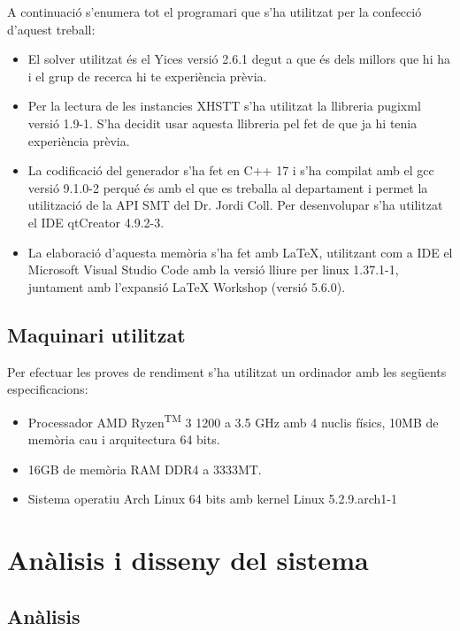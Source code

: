 \documentclass[11pt,a4paper,twoside]{report}
\begin{document}
  A continuació s'enumera tot el programari que s'ha utilitzat per la confecció d'aquest treball:
  \begin{itemize}
  \item El solver utilitzat és el Yices versió 2.6.1 degut a que és dels millors que hi ha i el grup de recerca hi te experiència prèvia. 
  \item Per la lectura de les instancies XHSTT s'ha utilitzat la llibreria pugixml versió 1.9-1. S'ha decidit usar aquesta llibreria pel fet de que ja hi tenia experiència prèvia.
  \item La codificació del generador s'ha fet en C++ 17 i s'ha compilat amb el gcc versió 9.1.0-2 perqué és amb el que es treballa al departament i permet la utilització de la API SMT del Dr. Jordi Coll. Per desenvolupar s'ha utilitzat el IDE qtCreator 4.9.2-3.
  \item La elaboració d'aquesta memòria s'ha fet amb \LaTeX, utilitzant com a IDE el Microsoft Visual Studio Code amb la versió lliure per linux 1.37.1-1, juntament amb l'expansió LaTeX Workshop (versió 5.6.0). 
  \end{itemize}

  \section{Maquinari utilitzat}
  Per efectuar les proves de rendiment s'ha utilitzat un ordinador amb les següents especificacions:
  \begin{itemize}
    \item Processador AMD Ryzen\textsuperscript{TM} 3 1200 a 3.5 GHz amb 4 nuclis físics,  10MB de memòria cau i arquitectura 64 bits.
    \item 16GB de memòria RAM DDR4 a 3333MT.
    \item Sistema operatiu Arch Linux 64 bits amb kernel Linux 5.2.9.arch1-1
  \end{itemize} 


  \chapter{Anàlisis i disseny del sistema}

  \section{Anàlisis}
\end{document}
